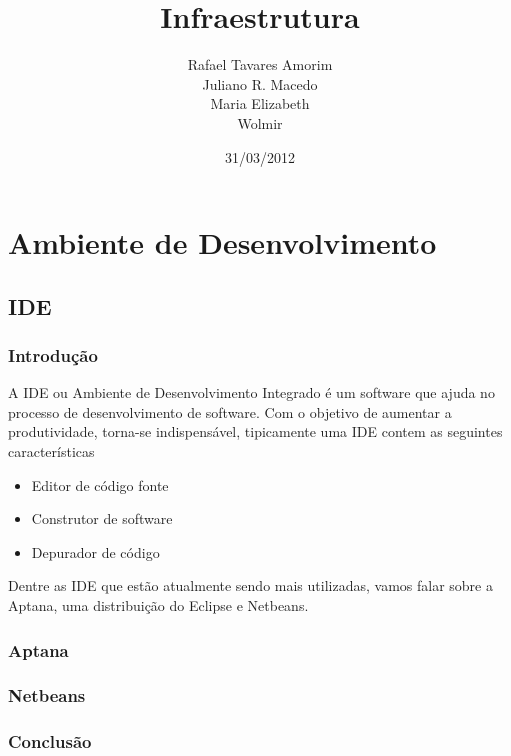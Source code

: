 \documentclass[12pt,a4paper]{article}
\begin{document}
\title{Infraestrutura}
\author{
Rafael Tavares Amorim \\
Juliano R. Macedo \\
Maria Elizabeth \\
Wolmir 
}
\date{31/03/2012}
\maketitle
\thispagestyle{empty}
\clearpage
\tableofcontents
\thispagestyle{empty}
\clearpage
\section{Ambiente de Desenvolvimento}
	\subsection{IDE}
		\subsubsection{Introdução}

				A IDE ou Ambiente de Desenvolvimento Integrado é um software que ajuda no
				processo de desenvolvimento de software. Com o objetivo de aumentar a
				produtividade, torna-se indispensável, tipicamente uma IDE contem as
				seguintes características
				\begin{itemize}
					\item Editor de código fonte
					\item Construtor de software
					\item Depurador de código
				\end{itemize}
				
				Dentre as IDE que estão atualmente sendo mais utilizadas, vamos falar sobre
				a Aptana, uma distribuição do Eclipse e Netbeans.
		
		\subsubsection{Aptana}
		
		\subsubsection{Netbeans}
		
		\subsubsection{Conclusão}
\end{document}
